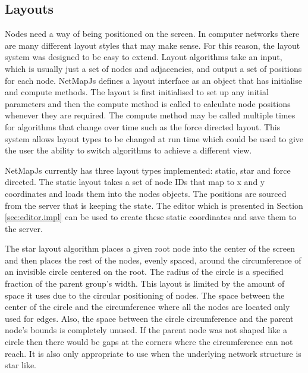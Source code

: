 \documentclass[11pt, a4paper]{article}
\begin{document}
\subsection{Layouts}
\label{sec:layouts.impl}

Nodes need a way of being positioned on the screen. In computer networks there
are many different layout styles that may make sense. For this reason, the
layout system was designed to be easy to extend. Layout algorithms take an
input, which is usually just a set of nodes and adjacencies, and output a set of
positions for each node. NetMapJs defines a layout interface as an object that
has initialise and compute methods. The layout is first initialised to set up
any initial parameters and then the compute method is called to calculate node
positions whenever they are required. The compute method may be called multiple
times for algorithms that change over time such as the force directed layout.
This system allows layout types to be changed at run time which could be used to
give the user the ability to switch algorithms to achieve a different view.

NetMapJs currently has three layout types implemented: static, star and force
directed. The static layout takes a set of node IDs that map to x and y
coordinates and loads them into the nodes objects. The positions are sourced
from the server that is keeping the state. The editor which is presented in
Section \ref{sec:editor.impl} can be used to create these static coordinates and
save them to the server.

The star layout algorithm places a given root node into the center of the screen
and then places the rest of the nodes, evenly spaced, around the circumference
of an invisible circle centered on the root. The radius of the circle is a
specified fraction of the parent group's width. This layout is limited by the
amount of space it uses due to the circular positioning of nodes. The space
between the center of the circle and the circumference where all the nodes are
located only used for edges. Also, the space between the circle circumference
and the parent node's bounds is completely unused. If the parent node was not
shaped like a circle then there would be gaps at the corners where the
circumference can not reach. It is also only appropriate to use when the
underlying network structure is star like.
\end{document}
